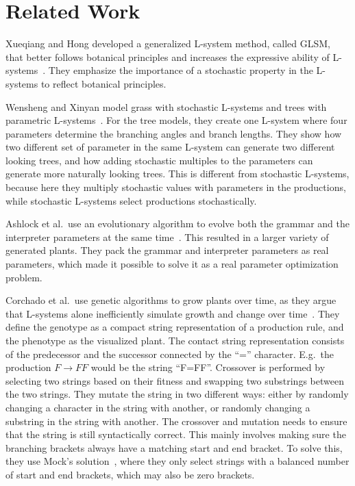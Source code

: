 \chapter{Related Work}
Xueqiang and Hong developed a generalized L-system method, called GLSM, that better follows botanical principles and increases the expressive ability of L-systems~\cite{Xueqiang2012}.
They emphasize the importance of a stochastic property in the L-systems to reflect botanical principles.

Wensheng and Xinyan model grass with stochastic L-systems and trees with parametric L-systems~\cite{Wensheng2010}.
For the tree models, they create one L-system where four parameters determine the branching angles and branch lengths.
They show how two different set of parameter in the same L-system can generate two different looking trees, and how adding stochastic multiples to the parameters can generate more naturally looking trees.
This is different from stochastic L-systems, because here they multiply stochastic values with parameters in the productions, while stochastic L-systems select productions stochastically.

Ashlock et al.\ use an evolutionary algorithm to evolve both the grammar and the interpreter parameters at the same time~\cite{Ashlock2006}.
This resulted in a larger variety of generated plants.
They pack the grammar and interpreter parameters as real parameters, which made it possible to solve it as a real parameter optimization problem.

Corchado et al.\ use genetic algorithms to grow plants over time, as they argue that L-systems alone inefficiently simulate growth and change over time~\cite{Corchado2009}.
They define the genotype as a compact string representation of a production rule, and the phenotype as the visualized plant.
The contact string representation consists of the predecessor and the successor connected by the ``='' character.
E.g.\ the production $F\rightarrow FF$ would be the string ``F=FF''.
Crossover is performed by selecting two strings based on their fitness and swapping two substrings between the two strings.
They mutate the string in two different ways: either by randomly changing a character in the string with another, or randomly changing a substring in the string with another.
The crossover and mutation needs to ensure that the string is still syntactically correct.
This mainly involves making sure the branching brackets always have a matching start and end bracket.
To solve this, they use Mock's solution~\cite{Mock1998}, where they only select strings with a balanced number of start and end brackets, which may also be zero brackets.

